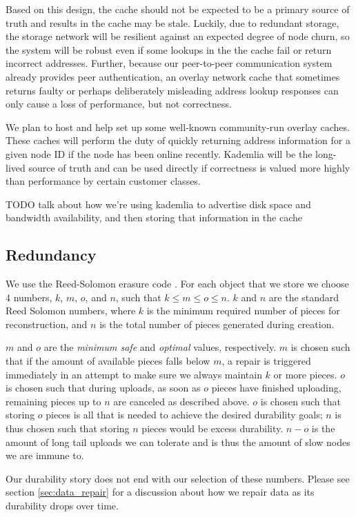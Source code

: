 \documentclass[a4paper,10pt]{article} \usepackage[utf8]{inputenc}
\newcommand{\todo}[1]{{\color{red} TODO #1 }}
\begin{document}
Based on this design, the cache should not be expected to be a primary source
of truth and results in the cache may be stale. Luckily, due to redundant
storage, the storage network will be resilient against an expected degree of
node churn, so the system will be robust even if some lookups in the the cache
fail or return incorrect addresses.
Further, because our peer-to-peer communication
system already provides peer authentication, an overlay network cache that
sometimes returns faulty
or perhaps deliberately misleading address lookup responses can only cause a
loss of performance, but not correctness.

We plan to host and help set up some well-known community-run overlay caches.
These caches will perform the duty of quickly returning address information
for a given node ID if the node has been online recently. Kademlia will be the
long-lived source of truth and can be used directly if correctness is valued
more highly than performance by certain customer classes.

\todo{talk about how we're using kademlia to advertise disk space and bandwidth
availability, and then storing that information in the cache}

\subsection{Redundancy}

We use the Reed-Solomon erasure code \cite{rs}. For each object that we store
we choose 4 numbers, $k$, $m$, $o$, and $n$, such that $k\le m\le o\le n$.
$k$ and $n$ are the standard Reed Solomon numbers, where $k$ is the minimum
required number of pieces for reconstruction, and $n$ is the total number of
pieces generated during creation.

$m$ and $o$ are the {\em minimum safe} and {\em optimal} values, respectively.
$m$ is chosen such that if the amount of available pieces falls below $m$, a
repair is triggered immediately in an attempt to make sure we always maintain
$k$ or more pieces. $o$ is chosen such that during uploads, as soon as $o$
pieces have finished uploading, remaining pieces up to $n$ are canceled as
described above. $o$ is chosen such that storing $o$ pieces is all that is
needed to achieve the desired durability goals; $n$ is thus chosen such that
storing $n$ pieces would be excess durability. $n-o$ is the amount of long
tail uploads we can tolerate and is thus the amount of slow nodes we are immune
to.

Our durability story does not end with our selection of these numbers.
Please see section \ref{sec:data_repair} for a discussion about how we repair
data as its durability drops over time.
\end{document}
